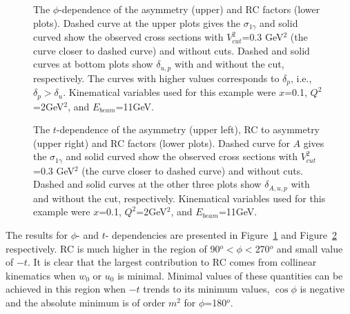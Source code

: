 \documentclass[aps,prd,reprint,groupedaddress,preprintnumbers,showpacs]{revtex4-1}
\begin{document}
\begin{figure}\centering
{}
\caption{\label{asymdep}The $\phi$-dependence of the asymmetry (upper) and RC  factors (lower plots). Dashed curve at the upper plots gives the $\sigma_{1\gamma}$ and solid curved show the observed cross sections with 
$V_{cut}^2$=0.3 GeV$^2$ (the curve closer to dashed curve) and without cuts. Dashed and solid curves at bottom plots show $\delta_{u,p}$ with and without the cut, respectively. The curves with higher values corresponds to $\delta_p$, i.e., $\delta_p>\delta_u$.   Kinematical variables used for this example were $x$=0.1, $Q^2$=2GeV$^2$, and $E_{beam}$=11GeV.
  }
 \end{figure}
 
\begin{figure}\centering
{}
\caption{\label{tdep}The $t$-dependence of the asymmetry (upper left), RC to asymmetry (upper right) and RC  factors (lower plots). Dashed curve for $A$ gives the $\sigma_{1\gamma}$ and solid curved show the observed cross sections with $V_{cut}^2$=0.3 GeV$^2$ (the curve closer to dashed curve) and without cuts. Dashed and solid curves at the other three plots show $\delta_{A,u,p}$ with and without the cut, respectively.  Kinematical variables used for this example were $x$=0.1, $Q^2$=2GeV$^2$, and $E_{beam}$=11GeV.
  }
 \end{figure}
 The results for $\phi$- and $t$- dependencies are presented in Figure~\ref{asymdep} and Figure~\ref{tdep} respectively. RC is much higher in the region of 90$^o<\phi<$270$^o$ and small value of $-t$.  It is clear that the largest contribution to RC comes from collinear kinematics when $w_0$ or $u_0$ is minimal. Minimal values of these quantities can be achieved  in this region when $-t$ trends to its minimum values, $\cos \phi$ is negative and the absolute minimum is of order $m^2$ for 
$\phi$=180$^o$. 
 
\end{document}
